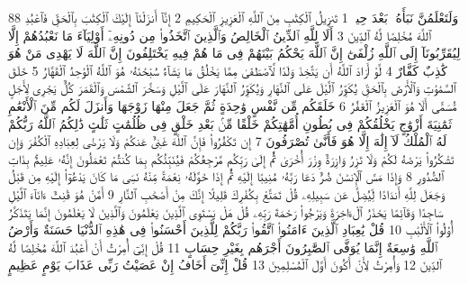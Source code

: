 {\tiny\colorbox{cl_aya}{88}} وَلَتَعْلَمُنَّ نَبَأَهُۥ بَعْدَ حِينٍۭ
{\tiny\colorbox{cl_aya}{1}} تَنزِيلُ ٱلْكِتَٰبِ مِنَ ٱللَّهِ ٱلْعَزِيزِ ٱلْحَكِيمِ
{\tiny\colorbox{cl_aya}{2}} إِنَّآ أَنزَلْنَآ إِلَيْكَ ٱلْكِتَٰبَ بِٱلْحَقِّ فَٱعْبُدِ ٱللَّهَ مُخْلِصًا لَّهُ ٱلدِّينَ
{\tiny\colorbox{cl_aya}{3}} أَلَا لِلَّهِ ٱلدِّينُ ٱلْخَالِصُ وَٱلَّذِينَ ٱتَّخَذُوا۟ مِن دُونِهِۦٓ أَوْلِيَآءَ مَا نَعْبُدُهُمْ إِلَّا لِيُقَرِّبُونَآ إِلَى ٱللَّهِ زُلْفَىٰٓ إِنَّ ٱللَّهَ يَحْكُمُ بَيْنَهُمْ فِى مَا هُمْ فِيهِ يَخْتَلِفُونَ إِنَّ ٱللَّهَ لَا يَهْدِى مَنْ هُوَ كَٰذِبٌ كَفَّارٌ
{\tiny\colorbox{cl_aya}{4}} لَّوْ أَرَادَ ٱللَّهُ أَن يَتَّخِذَ وَلَدًا لَّٱصْطَفَىٰ مِمَّا يَخْلُقُ مَا يَشَآءُ سُبْحَٰنَهُۥ هُوَ ٱللَّهُ ٱلْوَٰحِدُ ٱلْقَهَّارُ
{\tiny\colorbox{cl_aya}{5}} خَلَقَ ٱلسَّمَٰوَٰتِ وَٱلْأَرْضَ بِٱلْحَقِّ يُكَوِّرُ ٱلَّيْلَ عَلَى ٱلنَّهَارِ وَيُكَوِّرُ ٱلنَّهَارَ عَلَى ٱلَّيْلِ وَسَخَّرَ ٱلشَّمْسَ وَٱلْقَمَرَ كُلٌّ يَجْرِى لِأَجَلٍ مُّسَمًّى أَلَا هُوَ ٱلْعَزِيزُ ٱلْغَفَّٰرُ
{\tiny\colorbox{cl_aya}{6}} خَلَقَكُم مِّن نَّفْسٍ وَٰحِدَةٍ ثُمَّ جَعَلَ مِنْهَا زَوْجَهَا وَأَنزَلَ لَكُم مِّنَ ٱلْأَنْعَٰمِ ثَمَٰنِيَةَ أَزْوَٰجٍ يَخْلُقُكُمْ فِى بُطُونِ أُمَّهَٰتِكُمْ خَلْقًا مِّنۢ بَعْدِ خَلْقٍ فِى ظُلُمَٰتٍ ثَلَٰثٍ ذَٰلِكُمُ ٱللَّهُ رَبُّكُمْ لَهُ ٱلْمُلْكُ لَآ إِلَٰهَ إِلَّا هُوَ فَأَنَّىٰ تُصْرَفُونَ
{\tiny\colorbox{cl_aya}{7}} إِن تَكْفُرُوا۟ فَإِنَّ ٱللَّهَ غَنِىٌّ عَنكُمْ وَلَا يَرْضَىٰ لِعِبَادِهِ ٱلْكُفْرَ وَإِن تَشْكُرُوا۟ يَرْضَهُ لَكُمْ وَلَا تَزِرُ وَازِرَةٌ وِزْرَ أُخْرَىٰ ثُمَّ إِلَىٰ رَبِّكُم مَّرْجِعُكُمْ فَيُنَبِّئُكُم بِمَا كُنتُمْ تَعْمَلُونَ إِنَّهُۥ عَلِيمٌۢ بِذَاتِ ٱلصُّدُورِ
{\tiny\colorbox{cl_aya}{8}} وَإِذَا مَسَّ ٱلْإِنسَٰنَ ضُرٌّ دَعَا رَبَّهُۥ مُنِيبًا إِلَيْهِ ثُمَّ إِذَا خَوَّلَهُۥ نِعْمَةً مِّنْهُ نَسِىَ مَا كَانَ يَدْعُوٓا۟ إِلَيْهِ مِن قَبْلُ وَجَعَلَ لِلَّهِ أَندَادًا لِّيُضِلَّ عَن سَبِيلِهِۦ قُلْ تَمَتَّعْ بِكُفْرِكَ قَلِيلًا إِنَّكَ مِنْ أَصْحَٰبِ ٱلنَّارِ
{\tiny\colorbox{cl_aya}{9}} أَمَّنْ هُوَ قَٰنِتٌ ءَانَآءَ ٱلَّيْلِ سَاجِدًا وَقَآئِمًا يَحْذَرُ ٱلْءَاخِرَةَ وَيَرْجُوا۟ رَحْمَةَ رَبِّهِۦ قُلْ هَلْ يَسْتَوِى ٱلَّذِينَ يَعْلَمُونَ وَٱلَّذِينَ لَا يَعْلَمُونَ إِنَّمَا يَتَذَكَّرُ أُو۟لُوا۟ ٱلْأَلْبَٰبِ
{\tiny\colorbox{cl_aya}{10}} قُلْ يَٰعِبَادِ ٱلَّذِينَ ءَامَنُوا۟ ٱتَّقُوا۟ رَبَّكُمْ لِلَّذِينَ أَحْسَنُوا۟ فِى هَٰذِهِ ٱلدُّنْيَا حَسَنَةٌ وَأَرْضُ ٱللَّهِ وَٰسِعَةٌ إِنَّمَا يُوَفَّى ٱلصَّٰبِرُونَ أَجْرَهُم بِغَيْرِ حِسَابٍ
{\tiny\colorbox{cl_aya}{11}} قُلْ إِنِّىٓ أُمِرْتُ أَنْ أَعْبُدَ ٱللَّهَ مُخْلِصًا لَّهُ ٱلدِّينَ
{\tiny\colorbox{cl_aya}{12}} وَأُمِرْتُ لِأَنْ أَكُونَ أَوَّلَ ٱلْمُسْلِمِينَ
{\tiny\colorbox{cl_aya}{13}} قُلْ إِنِّىٓ أَخَافُ إِنْ عَصَيْتُ رَبِّى عَذَابَ يَوْمٍ عَظِيمٍ
